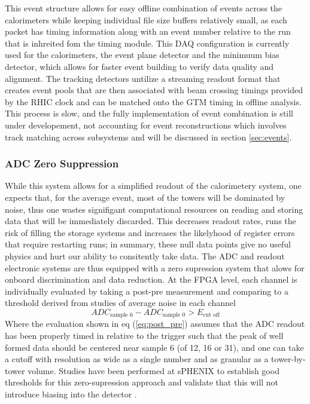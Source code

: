 \documentclass[letterpaper, 12pt, oneside]{book}
\theoremstyle{definition}
\begin{document}
		This event structure allows for easy offline combination of events across the calorimeters while keeping individual file size buffers relatively small, as each packet has timing information along with an event number relative to the run that is inhreited fom the timing module. 
		This DAQ configuration is currently used for the calorimeters, the event plane detector and the minimuum bias detector, which allows for faster event building to verify data quality and alignment. 
		The tracking detectors untilize a streaming readout format that creates event pools that are then associated with beam crossing timings provided by the RHIC clock and can be matched onto the GTM timing in offline analysis. 
		This process is slow, and the fully implementation of event combination is still under developement, not accounting for event reconstructions which involves track matching across subsystems and will be discussed in section \ref{sec:events}.
		\subsubsection{ADC Zero Suppression}
			\label{sec:zero_supr}
			While this system allows for a simplified readout of the calorimetery system, one expects that, for the average event, most of the towers will be dominated by noise, thus one wastes signifigant computational resources on reading and storing data that will be immediately discarded.
			This decreases readout rates, runs the risk of filling the storage systems and increases the likelyhood of register errors that require restarting runs; in summary, these null data points give no useful physics and hurt our ability to consitently take data. 
			The ADC and readout electronic systems are thus equipped with a zero supression system that alows for onboard discrimination and data reduction. 
			At the FPGA level, each channel is individually evaluated by taking a post-pre measurement and comparing to a threshold derived from studies of average noise in each channel
			\begin{equation}
				ADC_{\textrm{sample 6}} - ADC_{\textrm{sample 0}} > E_{\textrm{cut off}}
				\label{eq:post_pre}
			\end{equation}
			Where the evaluation shown in eq (\ref{eq:post_pre}) assumes that the ADC readout has been properly timed in relative to the trigger such that the peak of well formed data should be centered near sample 6 (of 12, 16 or 31), and one can take a cutoff with resolution as wide as a single number and as granular as a tower-by-tower volume. 
			Studies have been performed at sPHENIX to establish good thresholds for this zero-supression approach and validate that this will not introduce biasing into the detector \cite{Lis2020}. 
\end{document}
